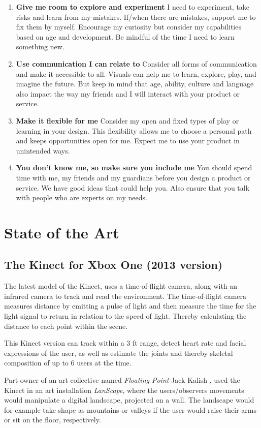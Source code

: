 \begin{enumerate}
    \item \textbf{Give me room to explore and experiment} I need to experiment, take risks and learn from my mistakes. If/when there are mistakes, support me to fix them by myself. Encourage my curiosity but consider my capabilities based on age and development. Be mindful of the time I need to learn something new.
    \item \textbf{Use communication I can relate to} Consider all forms of communication and make it accessible to all. Visuals can help me to learn, explore, play, and imagine the future. But keep in mind that age, ability, culture and language also impact the way my friends and I will interact with your product or service.
    \item \textbf{Make it flexible for me} Consider my open and fixed types of play or learning in your design. This flexibility allows me to choose a personal path and keeps opportunities open for me. Expect me to use your product in unintended ways.
    \item \textbf{You don’t know me, so make sure you include me} You should spend time with me, my friends and my guardians before you design a product or service. We have good ideas that could help you. Also ensure that you talk with people who are experts on my needs.
\end{enumerate}

\section{State of the Art}

    \subsection{The Kinect for Xbox One (2013 version)}
        The latest model of the Kinect, uses a time-of-flight camera, along with an infrared camera to track and read the environment\cite{KinectWiki}. The time-of-flight camera measures distance by emitting a pulse of light and then measure the time for the light signal to return in relation to the speed of light. Thereby calculating the distance to each point within the scene.
        
        This Kinect version can track within a 3 ft range, detect heart rate and facial expressions of the user, as well as estimate the joints and thereby skeletal composition of up to 6 users at the time\cite{KinectWiki}.
        
        Part owner of an art collective named \textit{Floating Point} Jack Kalish \cite{LANscapes}, used the Kinect in an art installation \textit{LanScape}, where the users/observers movements would manipulate a digital landscape, projected on a wall. The landscape would for example take shape as mountains or valleys if the user would raise their arms or sit on the floor, respectively.
        
